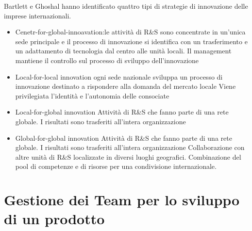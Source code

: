 \documentclass{article}
\begin{document}
Bartlett e Ghoshal hanno identificato quattro tipi di strategie di innovazione
delle imprese internazionali.

\begin{itemize}
\item  Cenetr-for-global-innoavation:le attività di R\&S sono
concentrate in un’unica sede
principale e il processo di
innovazione si identifica con
un trasferimento e un
adattamento di tecnologia dal
centro alle unità locali.
Il management mantiene il
controllo sul processo di
sviluppo dell’innovazione

\item Local-for-local innovation
ogni sede nazionale sviluppa un
processo di innovazione
destinato a rispondere alla
domanda del mercato locale
Viene privilegiata l’identità e
l’autonomia delle consociate

\item Local-for-global innovation
Attività di R\&S che fanno parte
di una rete globale. I risultati
sono trasferiti all’intera
organizzazione

\item Global-for-global innovation
Attività di R\&S che fanno parte
di una rete globale. I risultati
sono trasferiti all’intera
organizzazione Collaborazione con altre unità di
R\&S localizzate in diversi luoghi
geografici.
Combinazione del pool di
competenze e di risorse per una
condivisione internazionale.
\end{itemize}

\section{Gestione dei Team per lo sviluppo di un prodotto}
\end{document}
